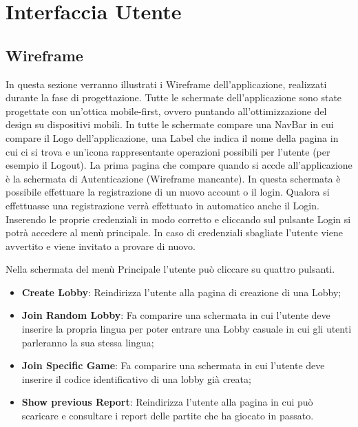 \section{Interfaccia Utente}
\subsection{Wireframe}

\noindent In questa sezione verranno illustrati i Wireframe dell'applicazione, realizzati durante la fase di progettazione.
Tutte le schermate dell'applicazione sono state progettate con un'ottica mobile-first, ovvero puntando all'ottimizzazione del design su dispositivi mobili.\newline
In tutte le schermate compare una NavBar in cui compare il Logo dell'applicazione, una Label che indica il nome della pagina in cui ci si trova e un'icona rappresentante operazioni possibili per l'utente (per esempio il Logout).\newline
La prima pagina che compare quando si accde all'applicazione è la schermata di Autenticazione (Wireframe mancante). In questa schermata è possibile effettuare la registrazione di un nuovo account o il login. Qualora si effettuasse una registrazione verrà effettuato in automatico anche il Login. Inserendo le proprie credenziali in modo corretto e cliccando sul pulsante Login si potrà accedere al menù principale.\newline
In caso di credenziali sbagliate l'utente viene avvertito e viene invitato a provare di nuovo.

\noindent Nella schermata del menù Principale l'utente può cliccare su quattro pulsanti.
\begin{itemize}
    \item \textbf{Create Lobby}: Reindirizza l'utente alla pagina di creazione di una Lobby;
    \item \textbf{Join Random Lobby}: Fa comparire una schermata in cui l'utente deve inserire la propria lingua per poter entrare una Lobby casuale in cui gli utenti parleranno la sua stessa lingua;
    \item \textbf{Join Specific Game}: Fa comparire una schermata in cui l'utente deve inserire il codice identificativo di una lobby già creata;
    \item \textbf{Show previous Report}: Reindirizza l'utente alla pagina in cui può scaricare e consultare i report delle partite che ha giocato in passato.
\end{itemize}

